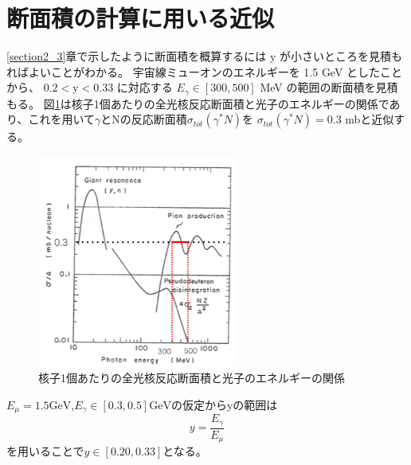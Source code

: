 \section{断面積の計算に用いる近似}
\ref{section2_3}章で示したように断面積を概算するには y が小さいところを見積もればよいことがわかる。
宇宙線ミューオンのエネルギーを 1.5 GeV としたことから、
$0.2 < \mathrm{y} < 0.33$ に対応する $E_\gamma \in [300, 500]$ MeV の範囲の断面積を見積もる。
図\ref{fig:sigma4}は核子1個あたりの全光核反応断面積と光子のエネルギーの関係であり、これを用いて$\gamma$とNの反応断面積$\sigma_{tot}(\gamma^* N)$を
$\sigma_{tot}(\gamma^* N) = 0.3$ mbと近似する。
\begin{figure}[H]
    \centering
    \includegraphics[height=7cm]{img/sigma_tot.png}
    \caption{核子1個あたりの全光核反応断面積と光子のエネルギーの関係}
    \label{fig:sigma4}
\end{figure}
$E_\mu = 1.5 \mathrm{GeV}$,$E_\gamma \in [0.3, 0.5] \mathrm{GeV}$の仮定からyの範囲は
\begin{equation}
    y = \dfrac{E_\gamma}{E_\mu}
\end{equation}
を用いることで$y \in [0.20, 0.33]$となる。

